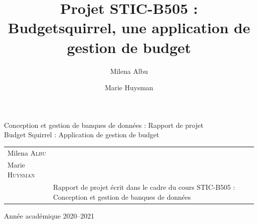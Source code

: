 \documentclass[a4paper,12pt]{article}
\title{Projet STIC-B505 : Budgetsquirrel, une application de gestion de budget}
\author{Milena Albu \and Marie Huysman} %
\date{} %
\begin{document}
\sloppy

\begin{titlepage} %
\singlespacing %

\begin{figure}[h]
\noindent
{}
\end{figure}

\vfill %


\begin{center}
\LARGE{Conception et gestion de banques de données : Rapport de projet}\\ %
\Large{ Budget Squirrel : Application de gestion de budget}
\vspace{.5cm}
\end{center}

\vfill

\begin{tabular}{b{5.5cm}b{7.5cm}} %
 \\ Milena \textsc{Albu} \\ Marie \textsc{Huysman} \\ & Rapport de projet écrit dans le cadre du cours STIC-B505 : Conception et gestion de banques de données \\
\end{tabular}

\vfill

\begin{center}
Année académique 2020--2021 %
\end{center}

\end{titlepage}
\end{document}
